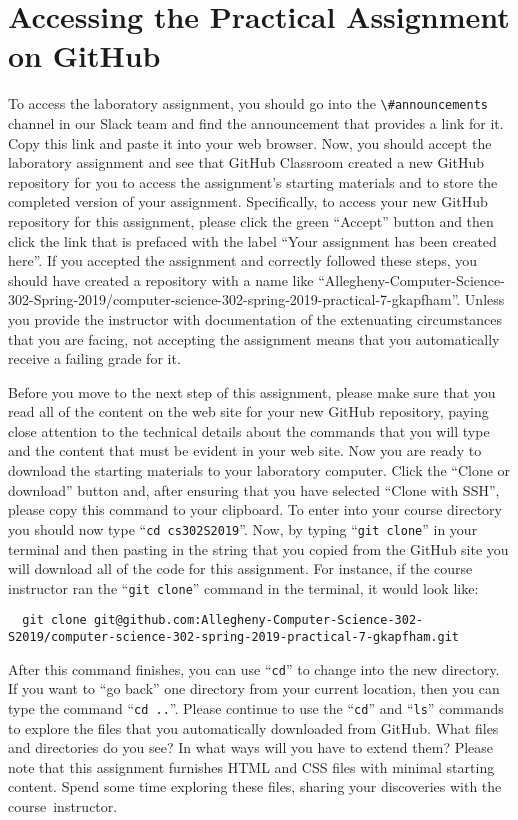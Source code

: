 \documentclass[11pt]{article}
\newcommand{\command}[1]{``\lstinline{#1}''}
\newcommand{\channel}[1]{\lstinline{#1}}
\newcommand{\step}[1]{``{#1}''}
\begin{document}
\section*{Accessing the Practical Assignment on GitHub}

To access the laboratory assignment, you should go into the
\channel{\#announcements} channel in our Slack team and find the announcement
that provides a link for it. Copy this link and paste it into your web browser.
Now, you should accept the laboratory assignment and see that GitHub Classroom
created a new GitHub repository for you to access the assignment's starting
materials and to store the completed version of your assignment. Specifically,
to access your new GitHub repository for this assignment, please click the green
``Accept'' button and then click the link that is prefaced with the label ``Your
assignment has been created here''. If you accepted the assignment and correctly
followed these steps, you should have created a repository with a name like
``Allegheny-Computer-Science-302-Spring-2019/computer-science-302-spring-2019-practical-7-gkapfham''.
Unless you provide the instructor with documentation of the extenuating
circumstances that you are facing, not accepting the assignment means that you
automatically receive a failing grade for it.

Before you move to the next step of this assignment, please make sure that you
read all of the content on the web site for your new GitHub repository, paying
close attention to the technical details about the commands that you will type
and the content that must be evident in your web site. Now you are ready to
download the starting materials to your laboratory computer. Click the ``Clone
or download'' button and, after ensuring that you have selected ``Clone with
SSH'', please copy this command to your clipboard. To enter into your course
directory you should now type \command{cd cs302S2019}. Now, by typing
\command{git clone} in your terminal and then pasting in the string that you
copied from the GitHub site you will download all of the code for this
assignment. For instance, if the course instructor ran the \command{git clone}
command in the terminal, it would look like:

\begin{lstlisting}
  git clone git@github.com:Allegheny-Computer-Science-302-S2019/computer-science-302-spring-2019-practical-7-gkapfham.git
\end{lstlisting}

After this command finishes, you can use \command{cd} to change into the new
directory. If you want to \step{go back} one directory from your current
location, then you can type the command \command{cd ..}. Please continue to use
the \command{cd} and \command{ls} commands to explore the files that you
automatically downloaded from GitHub. What files and directories do you see? In
what ways will you have to extend them? Please note that this assignment
furnishes HTML and CSS files with minimal starting content. Spend some time
exploring these files, sharing your discoveries with the \mbox{course
instructor}.
\end{document}
